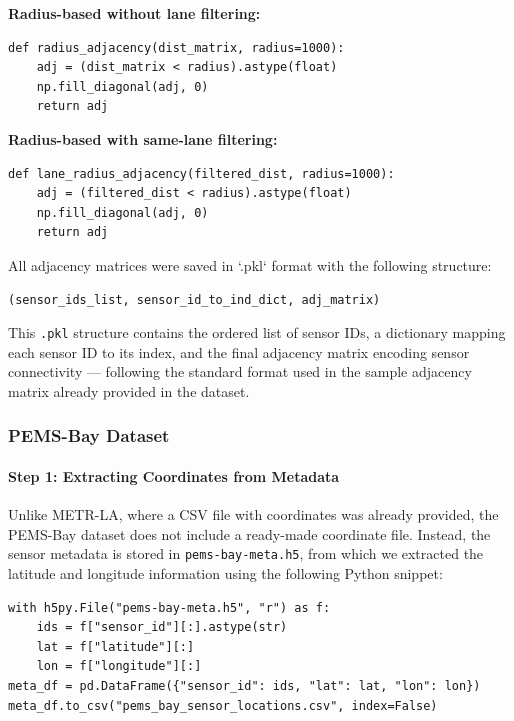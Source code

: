 \documentclass[runningheads]{llncs}
\begin{document}
\noindent\textbf{Radius-based without lane filtering:}
\begin{lstlisting}[style=customPython]
def radius_adjacency(dist_matrix, radius=1000):
    adj = (dist_matrix < radius).astype(float)
    np.fill_diagonal(adj, 0)
    return adj
\end{lstlisting}

\noindent\textbf{Radius-based with same-lane filtering:}
\begin{lstlisting}[style=customPython]
def lane_radius_adjacency(filtered_dist, radius=1000):
    adj = (filtered_dist < radius).astype(float)
    np.fill_diagonal(adj, 0)
    return adj
\end{lstlisting}

\noindent All adjacency matrices were saved in `.pkl` format with the following structure:
\begin{verbatim}
(sensor_ids_list, sensor_id_to_ind_dict, adj_matrix)
\end{verbatim}

This \texttt{.pkl} structure contains the ordered list of sensor IDs, a dictionary mapping each sensor ID to its index, and the final adjacency matrix encoding sensor connectivity --- following the standard format used in the sample adjacency matrix already provided in the dataset.

\subsubsection{PEMS-Bay Dataset}

\paragraph{Step 1: Extracting Coordinates from Metadata}
Unlike METR-LA, where a CSV file with coordinates was already provided, the PEMS-Bay dataset does not include a ready-made coordinate file. Instead, the sensor metadata is stored in \texttt{pems-bay-meta.h5}, from which we extracted the latitude and longitude information using the following Python snippet:

\begin{lstlisting}[style=customPython]
with h5py.File("pems-bay-meta.h5", "r") as f:
    ids = f["sensor_id"][:].astype(str)
    lat = f["latitude"][:]
    lon = f["longitude"][:]
meta_df = pd.DataFrame({"sensor_id": ids, "lat": lat, "lon": lon})
meta_df.to_csv("pems_bay_sensor_locations.csv", index=False)
\end{lstlisting}
\end{document}
